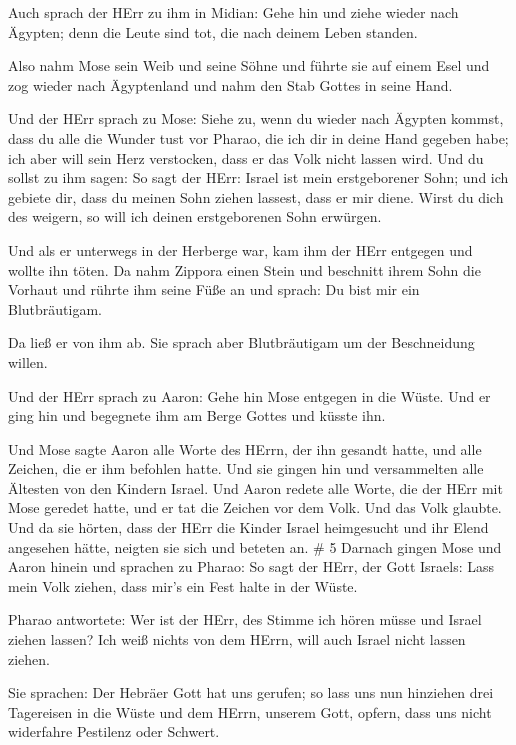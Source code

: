  Auch sprach der HErr zu ihm in Midian: Gehe hin und ziehe
wieder nach Ägypten; denn die Leute sind tot, die nach deinem Leben
standen.

 Also nahm Mose sein Weib und seine Söhne und führte sie
auf einem Esel und zog wieder nach Ägyptenland und nahm den Stab Gottes
in seine Hand.

 Und der HErr sprach zu Mose: Siehe zu, wenn du wieder nach
Ägypten kommst, dass du alle die Wunder tust vor Pharao, die ich dir in
deine Hand gegeben habe; ich aber will sein Herz verstocken, dass er das
Volk nicht lassen wird.  Und du sollst zu ihm sagen: So
sagt der HErr: Israel ist mein erstgeborener Sohn;  und ich
gebiete dir, dass du meinen Sohn ziehen lassest, dass er mir diene.
Wirst du dich des weigern, so will ich deinen erstgeborenen Sohn
erwürgen.

 Und als er unterwegs in der Herberge war, kam ihm der HErr
entgegen und wollte ihn töten.  Da nahm Zippora einen Stein
und beschnitt ihrem Sohn die Vorhaut und rührte ihm seine Füße an und
sprach: Du bist mir ein Blutbräutigam.

 Da ließ er von ihm ab. Sie sprach aber Blutbräutigam um
der Beschneidung willen.

 Und der HErr sprach zu Aaron: Gehe hin Mose entgegen in
die Wüste. Und er ging hin und begegnete ihm am Berge Gottes und küsste
ihn.

 Und Mose sagte Aaron alle Worte des HErrn, der ihn gesandt
hatte, und alle Zeichen, die er ihm befohlen hatte.  Und
sie gingen hin und versammelten alle Ältesten von den Kindern Israel.
 Und Aaron redete alle Worte, die der HErr mit Mose geredet
hatte, und er tat die Zeichen vor dem Volk.  Und das Volk
glaubte. Und da sie hörten, dass der HErr die Kinder Israel heimgesucht
und ihr Elend angesehen hätte, neigten sie sich und beteten an. \# 5
 Darnach gingen Mose und Aaron hinein und sprachen zu
Pharao: So sagt der HErr, der Gott Israels: Lass mein Volk ziehen, dass
mir's ein Fest halte in der Wüste.

 Pharao antwortete: Wer ist der HErr, des Stimme ich hören
müsse und Israel ziehen lassen? Ich weiß nichts von dem HErrn, will auch
Israel nicht lassen ziehen.

 Sie sprachen: Der Hebräer Gott hat uns gerufen; so lass uns
nun hinziehen drei Tagereisen in die Wüste und dem HErrn, unserem Gott,
opfern, dass uns nicht widerfahre Pestilenz oder Schwert.

